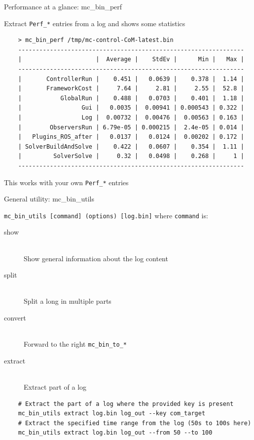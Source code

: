 \documentclass[c,aspectratio=169]{beamer}
\begin{document}
\begin{frame}[fragile]{Performance at a glance: mc\_bin\_perf}

  Extract \verb|Perf_*| entries from a log and shows some statistics

  \scriptsize

  \begin{verbatim}
    > mc_bin_perf /tmp/mc-control-CoM-latest.bin
    ----------------------------------------------------------------
    |                     |  Average |    StdEv |      Min |   Max |
    ----------------------------------------------------------------
    |       ControllerRun |    0.451 |   0.0639 |    0.378 |  1.14 |
    |       FrameworkCost |     7.64 |     2.81 |     2.55 |  52.8 |
    |           GlobalRun |    0.488 |   0.0703 |    0.401 |  1.18 |
    |                 Gui |   0.0035 |  0.00941 | 0.000543 | 0.322 |
    |                 Log |  0.00732 |  0.00476 |  0.00563 | 0.163 |
    |        ObserversRun | 6.79e-05 | 0.000215 |  2.4e-05 | 0.014 |
    |   Plugins_ROS_after |   0.0137 |   0.0124 |  0.00202 | 0.172 |
    | SolverBuildAndSolve |    0.422 |   0.0607 |    0.354 |  1.11 |
    |         SolverSolve |     0.32 |   0.0498 |    0.268 |     1 |
    ----------------------------------------------------------------
  \end{verbatim}

  \normalsize

  This works with your own \verb|Perf_*| entries
\end{frame}

\begin{frame}[fragile]{General utility: mc\_bin\_utils}

  \verb|mc_bin_utils [command] (options) [log.bin]| where \verb|command| is:

  \begin{description}
    \item[show] \hfill \\ Show general information about the log content
    \item[split] \hfill \\ Split a long in multiple parts
    \item[convert] \hfill \\ Forward to the right \verb|mc_bin_to_*|
    \item[extract] \hfill \\ Extract part of a log
  \end{description}

  \scriptsize
  \begin{verbatim}
    # Extract the part of a log where the provided key is present
    mc_bin_utils extract log.bin log_out --key com_target
    # Extract the specified time range from the log (50s to 100s here)
    mc_bin_utils extract log.bin log_out --from 50 --to 100
  \end{verbatim}
\end{frame}
\end{document}
